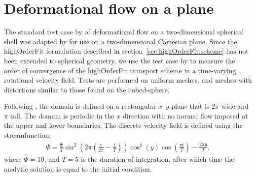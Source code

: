 \section{Deformational flow on a plane}
\label{sec:highOrderFit:deformationPlane}

The standard test case by \citet{lauritzen2012} of deformational flow on a two-dimensional spherical shell was adapted by \citet{chen2017} for use on a two-dimensional Cartesian plane.
Since the highOrderFit formulation described in section~\ref{sec:highOrderFit:scheme} has not been extended to spherical geometry, we use the test case by \citet{chen2017} to measure the order of convergence of the highOrderFit transport scheme in a time-varying, rotational velocity field.
Tests are performed on uniform meshes, and meshes with distortions similar to those found on the cubed-sphere.

Following \citet{chen2017}, the domain is defined on a rectangular $x$--$y$ plane that is $2\pi$ wide and $\pi$ tall.  The domain is periodic in the $x$ direction with no normal flow imposed at the upper and lower boundaries.
The discrete velocity field is defined using the streamfunction,
\begin{align}
	\Psi = \frac{\hat{\Psi}}{T} \sin^2 \left( 2 \pi \left( \frac{x}{2\pi} - \frac{t}{T} \right) \right) \cos^2(y) \cos \left( \frac{\pi t}{T} \right) - \frac{2\pi y}{T},
\end{align}
where $\hat{\Psi} = 10$, and $T = 5$ is the duration of integration, after which time the analytic solution is equal to the initial condition.

